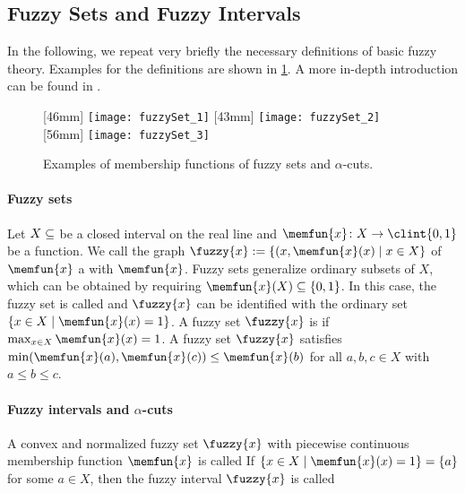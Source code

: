 \subsection{Fuzzy Sets and Fuzzy Intervals}
\label{sec:551fuzzySets}

In the following, we repeat very briefly the necessary
definitions of basic fuzzy theory.
Examples for the definitions are shown in \cref{fig:fuzzySet}.
A more in-depth introduction can be found in
.

\begin{figure}
  [46mm]{%
    \texttt{[image: fuzzySet\_1]}%
  }%
  \hfill%
  [43mm]{%
    \texttt{[image: fuzzySet\_2]}%
  }%
  \hfill%
  [56mm]{%
    \texttt{[image: fuzzySet\_3]}%
  }%
  \caption[%
    Examples of fuzzy sets and $\alpha$-cuts%
  ]{%
    Examples of membership functions of fuzzy sets and $\alpha$-cuts.%
  }%
  \label{fig:fuzzySet}%
\end{figure}

\paragraph{Fuzzy sets}

Let $X \subset \real$ be a closed interval on the real line
and $\memfun{x}\colon X \to \clint{0, 1}$ be a function.
We call the graph $\fuzzy{x} := \{(x, \memfun{x}(x) \mid x \in X\}$
of $\memfun{x}$ a  with
 $\memfun{x}$.
Fuzzy sets generalize ordinary subsets of $X$,
which can be obtained by requiring $\memfun{x}(X) \subset \{0, 1\}$.
In this case, the fuzzy set is called  and
$\fuzzy{x}$ can be identified with the ordinary set
$\{x \in X \mid \memfun{x}(x) = 1\}$.
A fuzzy set $\fuzzy{x}$ is 
if $\max_{x \in X} \memfun{x}(x) = 1$.
A  fuzzy set $\fuzzy{x}$ satisfies
$\min(\memfun{x}(a), \memfun{x}(c)) \le \memfun{x}(b)$ for all $a, b, c \in X$
with $a \le b \le c$.

\paragraph{Fuzzy intervals and $\alpha$-cuts}

A convex and normalized fuzzy set $\fuzzy{x}$ with
piecewise continuous membership function $\memfun{x}$ is called
If $\{x \in X \mid \memfun{x}(x) = 1\} = \{a\}$ for some $a \in X$,
then the fuzzy interval $\fuzzy{x}$ is called 

